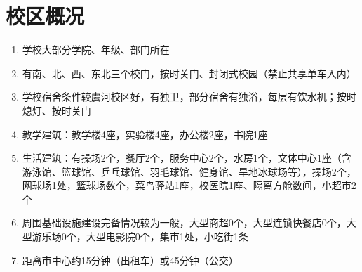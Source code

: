 \section*{校区概况}
\begin{enumerate}
    \item 学校大部分学院、年级、部门所在
    \item 有南、北、西、东北三个校门，按时关门、封闭式校园\footnotemark （禁止共享单车入内）
    \item 学校宿舍条件较虞河校区好，有独卫，部分宿舍有独浴，每层有饮水机；按时熄灯、按时关门
    \item 教学建筑：教学楼4座，实验楼4座，办公楼2座，书院1座
    \item 生活建筑：有操场2个，餐厅2个，服务中心2个，水房1个，文体中心1座（含游泳馆、篮球馆、乒乓球馆、羽毛球馆、健身馆、旱地冰球场等），操场2个，网球场1处，篮球场数个，菜鸟驿站1座，校医院1座、隔离方舱数间，小超市2个
    \item 周围基础设施建设完备情况较为一般，大型商超0个，大型连锁快餐店0个，大型游乐场0个，大型电影院0个，集市1处，小吃街1条
    \item 距离市中心约15分钟（出租车）或45分钟（公交）
\end{enumerate}

